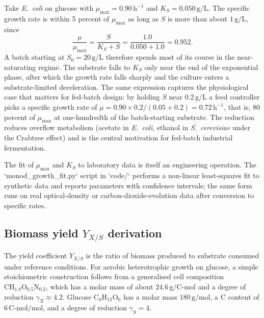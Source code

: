 Take \emph{E.\ coli} on glucose with $\mu_{\max} = 0.90\,\text{h}^{-1}$
and $K_S = 0.050\,\text{g}/\text{L}$. The specific growth rate is
within 5 percent of $\mu_{\max}$ as long as $S$ is more than about
$1\,\text{g}/\text{L}$, since
\[
\frac{\mu}{\mu_{\max}}
= \frac{S}{K_S + S}
= \frac{1.0}{0.050 + 1.0}
= 0.952.
\]
A batch starting at $S_0 = 20\,\text{g}/\text{L}$ therefore spends
most of its course in the near-saturating regime. The substrate falls
to $K_S$ only near the end of the exponential phase, after which the
growth rate falls sharply and the culture enters a substrate-limited
deceleration. The same expression captures the physiological case
that matters for fed-batch design: by holding $S$ near $0.2\,\text{g}/
\text{L}$ a feed controller picks a specific growth rate of
$\mu = 0.90 \times 0.2 / (0.05 + 0.2) = 0.72\,\text{h}^{-1}$, that is,
80 percent of $\mu_{\max}$ at one-hundredth of the batch-starting
substrate. The reduction reduces overflow metabolism (acetate in
\emph{E.\ coli}, ethanol in \emph{S.\ cerevisiae} under the Crabtree
effect) and is the central motivation for fed-batch industrial
fermentation.

The fit of $\mu_{\max}$ and $K_S$ to laboratory data is itself an
engineering operation. The `monod_growth_fit.py` script in `code/`
performs a non-linear least-squares fit to synthetic data and reports
parameters with confidence intervals; the same form runs on real
optical-density or carbon-dioxide-evolution data after conversion to
specific rates.

\subsection{Biomass yield $Y_{X/S}$ derivation}

The yield coefficient $Y_{X/S}$ is the ratio of biomass produced to
substrate consumed under reference conditions. For aerobic
heterotrophic growth on glucose, a simple stoichiometric construction
follows from a generalised cell composition $\text{CH}_{1.8}\text{O}_{0.5}\text{N}_{0.2}$,
which has a molar mass of about $24.6\,\text{g}/\text{C-mol}$ and a
degree of reduction $\gamma_X \approx 4.2$. Glucose
$\text{C}_6\text{H}_{12}\text{O}_6$ has a molar mass
$180\,\text{g}/\text{mol}$, a C content of $6\,\text{C-mol}/\text{mol}$,
and a degree of reduction $\gamma_S = 4$.

